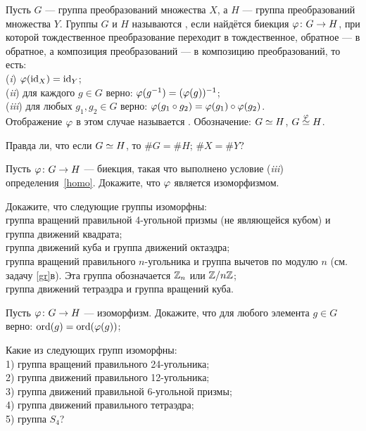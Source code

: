 \documentclass[a4paper,12pt]{article}
\begin{document}


\label{homo}
Пусть $G$ --- группа преобразований множества $X$, а $H$ --- группа преобразований множества $Y$. Группы $G$ и $H$ называются , если найдётся биекция $\varphi \colon G \rightarrow H$, при которой тождественное преобразование переходит в тождественное, обратное --- в обратное, а композиция преобразований --- в композицию преобразований, то есть:\\
(\emph{i}\/) $\varphi(\operatorname{id}_X) = \operatorname{id}_Y$;\\
(\emph{ii}\/) для каждого $g \in G$ верно: $\varphi(g^{-1}) = (\varphi(g))^{-1}$;\\
(\emph{iii}\/) для любых $g_1,g_2\in G$ верно: $\varphi(g_1\circ g_2)=\varphi(g_1)\circ\varphi(g_2)$.\\
Отображение $\varphi$ в этом случае называется .
 Обозначение: $G\simeq H$, $G\stackrel{\varphi}{\simeq} H$.

Правда ли, что если $G\simeq H$, то
 $\#G = \#H$;
 $\#X = \#Y$?

Пусть $\varphi \colon G \rightarrow H$ --- биекция, такая что выполнено условие (\emph{iii}\/) определения~\ref{homo}. Докажите, что $\varphi$ является изоморфизмом.


Докажите, что следующие группы изоморфны:\\
 группа вращений правильной 4-угольной призмы (не являющейся кубом) и группа движений квадрата;\\
 группа движений куба и группа движений октаэдра;\\
 группа вращений правильного $n$-угольника и группа вычетов по модулю $n$ (см. задачу \ref{gr}в). Эта группа обозначается $\mathbb{Z}_n$ или $\mathbb{Z}/n\mathbb{Z}$;\\
 группа движений тетраэдра и группа вращений куба.


Пусть $\varphi\colon G\rightarrow H$ --- изоморфизм. Докажите, что
для любого элемента $g\in G$ верно: $\operatorname{ord}(g) = \operatorname{ord}(\varphi(g))$;

Какие из следующих групп изоморфны:\\
1) группа вращений правильного 24-угольника;\\
2) группа движений правильного 12-угольника;\\
3) группа движений правильной 6-угольной призмы;\\
4) группа движений правильного тетраэдра;\\
5) группа $S_4$?
\end{document}
